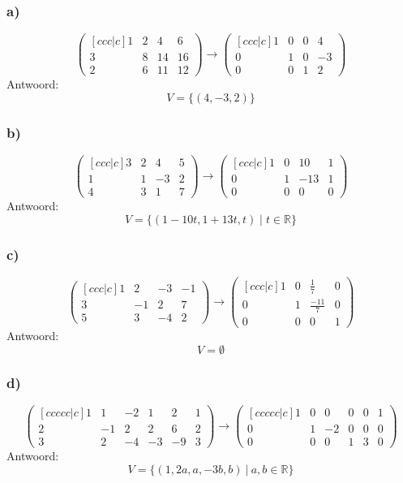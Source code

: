 \documentclass[lineaire_algebra_oplossingen.tex]{subfiles}
\begin{document}
\subsubsection*{a)}
\[
\begin{pmatrix}[ccc|c]
1 &  2 &  4 &  6\\
3 &  8 & 14 & 16\\
2 &  6 & 11 & 12
\end{pmatrix}
\longrightarrow
\begin{pmatrix}[ccc|c]
1 &  0 &  0 &  4\\
0 &  1 &  0 & -3\\
0 &  0 &  1 &  2
\end{pmatrix}
\]
Antwoord:
\[
V=\{(4,-3,2)\}
\]

\subsubsection*{b)}
\[
\begin{pmatrix}[ccc|c]
3 &  2 &  4 &  5\\
1 &  1 & -3 &  2\\
4 &  3 &  1 &  7
\end{pmatrix}
\longrightarrow
\begin{pmatrix}[ccc|c]
1 &  0 & 10 &  1\\
0 &  1 & -13&  1\\
0 &  0 &  0 &  0
\end{pmatrix}
\]
Antwoord:
\[
V=\{(1-10t,1+13t,t) \mid t \in \mathbb{R}\}
\]

\subsubsection*{c)}
\[
\begin{pmatrix}[ccc|c]
1 &  2 & -3 & -1\\
3 & -1 &  2 &  7\\
5 &  3 & -4 &  2
\end{pmatrix}
\longrightarrow
\begin{pmatrix}[ccc|c]
1 &  0 & \frac{1}{7} &  0\\
0 &  1 & \frac{-11}{7}&  0\\
0 &  0 &  0 &  1
\end{pmatrix}
\]
Antwoord:
\[
V=\emptyset
\]

\subsubsection*{d)}
\[
\begin{pmatrix}[ccccc|c]
1 &  1 & -2 &  1 &  2 & 1\\
2 & -1 &  2 &  2 &  6 & 2\\
3 &  2 & -4 & -3 & -9 & 3
\end{pmatrix}
\longrightarrow
\begin{pmatrix}[ccccc|c]
1 &  0 &  0 &  0 &  0 & 1\\
0 &  1 & -2 &  0 &  0 & 0\\
0 &  0 &  0 &  1 &  3 & 0
\end{pmatrix}
\]
Antwoord:
\[
V=\{(1,2a,a,-3b,b)\ |\ a,b \in \mathbb{R} \}
\]
\end{document}

